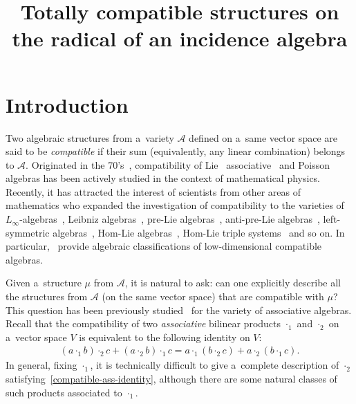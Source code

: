 \documentclass{jonasart}
\title{Totally compatible structures on the radical of an incidence algebra}
\newcommand{\A}{\mathcal{A}}
\begin{document}
    \clearpage
    \section*{Introduction}

	Two algebraic structures from a~variety $\A$ defined on a~same vector space are said to be \textit{compatible} if their sum (equivalently, any linear combination) belongs to $\A$. Originated in the 70's~\cite{Magri78}, compatibility of Lie~\cite{Golubchik-Sokolov02,Golubchik-Sokolov05} associative~\cite{Carinena-Grabowski-Marmo2000,Odesskii-Sokolov06} and Poisson~\cite{Bolsinov91,Bolsinov-Borisov02,Reyman-Semenov89} algebras has been actively studied in the context of mathematical physics. Recently, it has attracted the interest of scientists from other areas of mathematics who expanded the investigation of compatibility to the varieties of $L_\infty$-algebras~\cite{Das22}, Leibniz algebras~\cite{Makhlouf-Saha23}, pre-Lie algebras~\cite{Abdelwahab-Kaygorodov-Makhlouf24}, anti-pre-Lie algebras~\cite{Normatov24}, left-symmetric algebras~\cite{Wu25}, Hom-Lie algebras~\cite{Das23CompHomLie}, Hom-Lie triple systems~\cite{Teng-Long-Zhang-Lin23} and so on. In particular,~\cite{Abdelwahab-Kaygorodov-Makhlouf24,Ladra-Cunha-Lopes24,Makhlouf-Saha23} provide algebraic classifications of low-dimensional compatible algebras.

	Given a~structure $\mu$ from $\A$, it is natural to ask: can one explicitly describe all the structures from $\A$ (on the same vector space) that are compatible with $\mu$? This question has been previously studied~\cite{Carinena-Grabowski-Marmo2000,Odesskii-Sokolov06} for the variety of associative algebras. Recall that the compatibility of two \textit{associative} bilinear products $\cdot_1$ and $\cdot_2$ on a~vector space $V$ is equivalent to the following identity on $V$:
	\begin{align}\label{compatible-ass-identity}
		(a\cdot_1 b)\cdot_2 c + (a\cdot_2 b)\cdot_1 c = a\cdot_1 (b\cdot_2 c) + a\cdot_2 (b\cdot_1 c).
	\end{align}
	In general, fixing $\cdot_1$, it is technically difficult to give a~complete description of $\cdot_2$ satisfying~\eqref{compatible-ass-identity}, although there are some natural classes of such products associated to $\cdot_1$.
\end{document}
